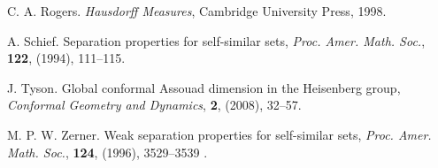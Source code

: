 \documentclass[11pt,english,british]{article}
\numberwithin{equation}{section}
\begin{document}
\begin{thebibliography}{99}
C. A. Rogers. \emph{Hausdorff Measures},  Cambridge University Press, 1998.


A. Schief.
Separation properties for self-similar sets,
\emph{Proc. Amer. Math. Soc.}, {\bf 122}, (1994), 111--115.


J. Tyson.
Global conformal Assouad dimension in the Heisenberg group,
\emph{Conformal Geometry and Dynamics}, {\bf 2}, (2008), 32--57.

 M. P. W. Zerner.  Weak separation properties for
  self-similar sets, \emph{Proc. Amer. Math. Soc.}, {\bf 124}, (1996),
  3529--3539 .








\end{thebibliography}
\end{document}
